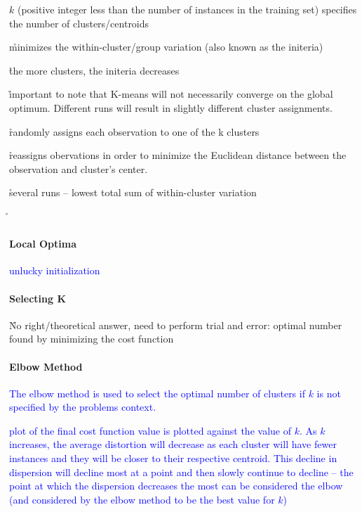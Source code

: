 \r{$k$ (positive integer less than the number of instances in the training set) specifies the number of clusters/centroids}

\r{minimizes the within-cluster/group variation (also known as the initeria)}

\r{the more clusters, the initeria decreases}


\r{important to note that K-means will not necessarily converge on the global optimum. Different runs will result in slightly different cluster assignments.}

\r{randomly assigns each observation to one of the k clusters}

\r{reassigns obervations in order to minimize the Euclidean distance between the observation and cluster's center.}

\r{several runs -- lowest total sum of within-cluster variation}


\r{}

\paragraph{Local Optima}

\textcolor{blue}{unlucky initialization}

\paragraph{Selecting K}


\r{No right/theoretical answer, need to perform trial and error: optimal number found by minimizing the cost function}

\paragraph{Elbow Method}

\textcolor{blue}{The elbow method is used to select the optimal number of clusters if $k$ is not specified by the problems context.}

\textcolor{blue}{plot of the final cost function value is plotted against the value of $k$. As $k$ increases, the average distortion will decrease as each cluster will have fewer instances and they will be closer to their respective centroid. This decline in dispersion will decline most at a point and then slowly continue to decline -- the point at which the dispersion decreases the most can be considered the elbow (and considered by the elbow method to be the best value for $k$)}

